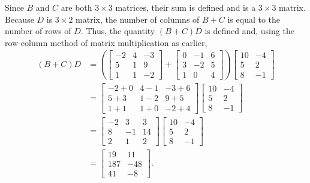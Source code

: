 \begin{example}
\item  Since $B$ and $C$ are both $3 \times 3$ matrices, their sum is defined and is a $3 \times 3$ matrix. Because $D$ is $3 \times 2$ matrix, the number of columns of $B+C$ is equal to the number of rows of $D$. Thus, the quantity $(B+C)D$ is defined and, using the row-column method of matrix multiplication as earlier,  
\begin{align*}
(B+C)D &= \left( \left[ \begin{array}{rcr} -2&4&-3\\5&1&9\\1&1&-2 \end{array} \right] +  \left[ \begin{array}{crc} 0&-1&6\\3&-2&5\\1&0&4 \end{array} \right] \right) \left[ \begin{array}{cr} 10&-4\\5&2\\8&-1 \end{array} \right] \\
	&=  \left[ \begin{array}{ccc} -2+0&4-1&-3+6\\5+3&1-2&9+5\\1+1&1+0&-2+4 \end{array} \right]  \left[ \begin{array}{cr} 10&-4\\5&2\\8&-1 \end{array} \right] \\
	&= \left[ \begin{array}{rrc} -2&3&3\\8&-1&14\\2&1&2 \end{array} \right]  \left[ \begin{array}{cr} 10&-4\\5&2\\8&-1 \end{array} \right] \\
	&=  \left[ \begin{array}{cr} 19&11 \\ 187&-48 \\ 41&-8 \end{array} \right].
\end{align*}


\end{example}
